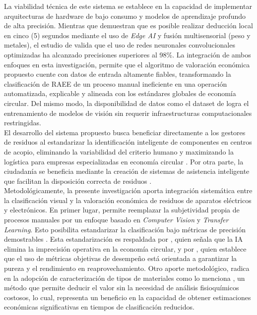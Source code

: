 La viabilidad técnica de este sistema se establece en la capacidad de implementar arquitecturas de hardware de bajo consumo y modelos de aprendizaje profundo de alta precisión. Mientras que \cite{p.sLowPowerEdgeAI2026} demuestran que es posible realizar deducción local en cinco (5) segundos mediante el uso de \textit{Edge AI} y fusión multisensorial (peso y metales), el estudio de valida que el uso de redes neuronales convolucionales optimizadas ha alcanzado precisiones superiores al 98\%. La integración de ambos enfoques en esta investigación, permite que el algoritmo de valoración económica propuesto cuente con datos de entrada altamente fiables, transformando la clasificación de RAEE de un proceso manual ineficiente en una operación automatizada, explicable y alineada con los estándares globales de economía circular. Del mismo modo, la disponibilidad de datos como el dataset de \cite{vogelgesangMaterialFlowComposition2026} logra el entrenamiento de modelos de visión sin requerir infraestructuras computacionales restringidas.\\

El desarrollo del sistema propuesto busca beneficiar directamente a los gestores de residuos al estandarizar la identificación inteligente de componentes en centros de acopio, eliminando la variabilidad del criterio humano \cite{varshaDataDrivenEWasteManagement2025a} y maximizando la logística para empresas especializadas en economía circular \cite{dehabadi_how_2026}. Por otra parte, la ciudadanía se beneficia mediante la creación de sistemas de asistencia inteligente que facilitan la disposición correcta de residuos \cite{madusankaUrbanGreenEWasteDetection2025a}.\\

Metodológicamente, la presente investigación aporta integración sistemática entre la clasificación visual y la valoración económica de residuos de aparatos eléctricos y electrónicos. En primer lugar, permite reemplazar la subjetividad propia de procesos manuales por un enfoque basado en \textit{Computer Vision} y \textit{Transfer Learning}. Esto posibilita estandarizar la clasificación bajo métricas de precisión demostrables \cite{p.sLowPowerEdgeAI2026}. Esta estandarización es respaldada por \cite{janoClosingLoopSystematic2026}, quien señala que la IA elimina la imprecisión operativa en la economía circular, y por \cite{donmez_benchmarking_2025}, quien establece que el uso de métricas objetivas de desempeño está orientada a garantizar la pureza y el rendimiento en reaprovechamiento. Otro aporte metodológico, radica en la adopción de caracterización de tipos de materiales como lo menciona \cite{vogelgesangMaterialFlowComposition2026}, un método que permite deducir el valor sin la necesidad de análisis fisioquímicos costosos, lo cual, representa un beneficio en la capacidad de obtener estimaciones económicas significativas en tiempos de clasificación reducidos.
